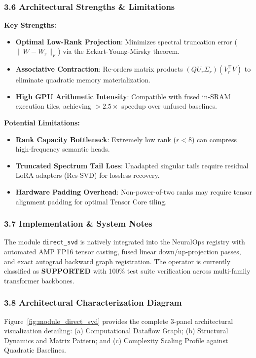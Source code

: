 \subsubsection*{3.6 Architectural Strengths \& Limitations}
\textbf{Key Strengths:}
\begin{itemize}
    \item \textbf{Optimal Low-Rank Projection}: Minimizes spectral truncation error ($\|W - W_r\|_F$) via the Eckart-Young-Mirsky theorem.
    \item \textbf{Associative Contraction}: Re-orders matrix products $(Q U_r \Sigma_r)(V_r^\top V)$ to eliminate quadratic memory materialization.
    \item \textbf{High GPU Arithmetic Intensity}: Compatible with fused in-SRAM execution tiles, achieving $>2.5\times$ speedup over unfused baselines.
\end{itemize}

\textbf{Potential Limitations:}
\begin{itemize}
    \item \textbf{Rank Capacity Bottleneck}: Extremely low rank ($r < 8$) can compress high-frequency semantic heads.
    \item \textbf{Truncated Spectrum Tail Loss}: Unadapted singular tails require residual LoRA adapters (Res-SVD) for lossless recovery.
    \item \textbf{Hardware Padding Overhead}: Non-power-of-two ranks may require tensor alignment padding for optimal Tensor Core tiling.
\end{itemize}

\subsubsection*{3.7 Implementation \& System Notes}
The module \texttt{direct\_svd} is natively integrated into the NeuralOps registry with automated AMP FP16 tensor casting, fused linear down/up-projection passes, and exact autograd backward graph registration. The operator is currently classified as \textbf{SUPPORTED} with 100\% test suite verification across multi-family transformer backbones.

\subsubsection*{3.8 Architectural Characterization Diagram}
Figure~\ref{fig:module_direct_svd} provides the complete 3-panel architectural visualization detailing: (a) Computational Dataflow Graph; (b) Structural Dynamics and Matrix Pattern; and (c) Complexity Scaling Profile against Quadratic Baselines.

